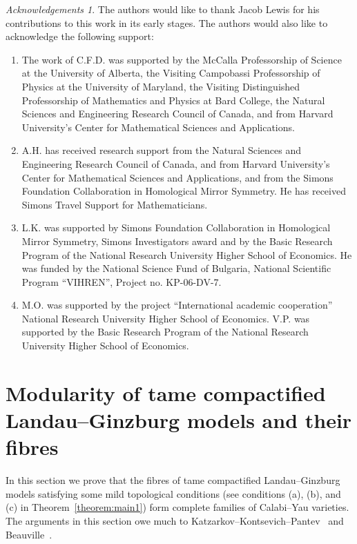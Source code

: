 \documentclass[10pt]{amsart}
\numberwithin{equation}{section}
\theoremstyle{plain}
\theoremstyle{definition}
\theoremstyle{remark}
\newtheorem*{acknowledgements}{Acknowledgements}
\begin{document}
\begin{acknowledgements}
  The authors would like to thank Jacob Lewis for his contributions to this work in its early stages. The authors would also like to acknowledge the following support:
  \begin{enumerate}[(1)]
  \item The work of C.F.D. was supported by the McCalla Professorship of Science at the University of Alberta, the Visiting Campobassi Professorship of Physics at the University of Maryland, the Visiting Distinguished Professorship of Mathematics and Physics at Bard College,  the Natural Sciences and Engineering Research Council of Canada, and from Harvard University's Center for Mathematical Sciences and Applications.
  \item A.H. has received research support from the Natural Sciences and Engineering Research Council of Canada, and from Harvard University's Center for Mathematical Sciences and Applications, and from the Simons Foundation Collaboration in Homological Mirror Symmetry. He has received Simons Travel Support for Mathematicians.
  \item L.K. was supported by Simons Foundation Collaboration in Homological Mirror Symmetry, Simons Investigators award and by the Basic Research Program of the National Research University Higher School of Economics. He was funded by the National Science Fund of Bulgaria, National Scientific Program ``VIHREN'', Project no. KP-06-DV-7.
  \item M.O. was supported by the project ``International academic cooperation'' National Research University Higher School of Economics. V.P. was supported by the Basic Research Program of the National Research University Higher School of Economics.
  \end{enumerate}
\end{acknowledgements}

\section{Modularity of tame compactified Landau--Ginzburg models and their fibres}\label{section:modlg}

In this section we prove that the fibres of tame compactified Landau--Ginzburg models satisfying some mild topological conditions (see conditions (a), (b), and (c) in Theorem~\ref{theorem:main1}) form complete families of Calabi--Yau varieties. The arguments in this section owe much to Katzarkov--Kontsevich--Pantev~\cite{katzarkov2017bogomolov} and Beauville~\cite{beauvillefano}.
\end{document}

